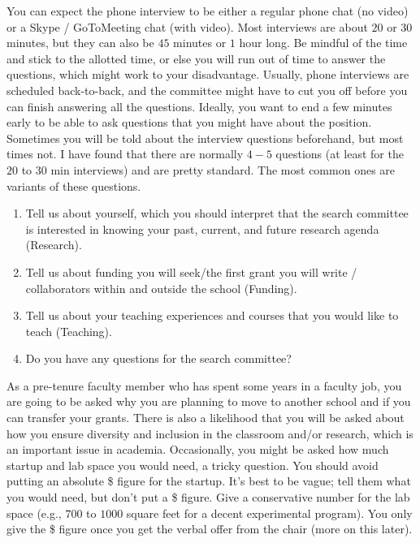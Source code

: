 \documentclass[14pt]{article}
\begin{document}
You can expect the phone interview to be either a regular phone chat (no video) or a Skype / GoToMeeting chat (with video). Most interviews are about $20$ or $30$ minutes, but they can also be $45$ minutes or $1$ hour long. Be mindful of the time and stick to the allotted time, or else you will run out of time to answer the questions, which might work to your disadvantage. Usually, phone interviews are scheduled back-to-back, and the committee might have to cut you off before you can finish answering all the questions. Ideally, you want to end a few minutes early to be able to ask questions that you might have about the position. Sometimes you will be told about the interview questions beforehand, but most times not. I have found that there are normally $4-5$ questions (at least for the $20$ to $30$ min interviews) and are pretty standard. The most common ones are variants of these questions.
\begin{enumerate}
\item Tell us about yourself, which you should interpret that the search committee is interested in knowing your past, current, and future research agenda (Research).
\item Tell us about funding you will seek/the first grant you will write / collaborators within and outside the school (Funding).
\item Tell us about your teaching experiences and courses that you would like to teach (Teaching). 
\item Do you have any questions for the search committee?
\end{enumerate}
As a pre-tenure faculty member who has spent some years in a faculty job, you are going to be asked why you are planning to move to another school and if you can transfer your grants. There is also a likelihood that you will be asked about how you ensure diversity and inclusion in the classroom and/or research, which is an important issue in academia. Occasionally, you might be asked how much startup and lab space you would need, a tricky question. You should avoid putting an absolute \$ figure for the startup. It's best to be vague; tell them what you would need, but don't put a \$ figure. Give a conservative number for the lab space (e.g., $700$ to $1000$ square feet for a decent experimental program). You only give the \$ figure once you get the verbal offer from the chair (more on this later).
\end{document}
